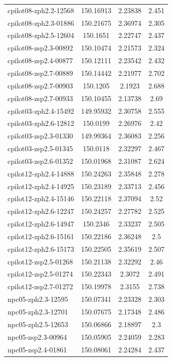 \documentclass[twocolumn,tight,times]{aastex63}
\begin{document}
\begin{center}
\begin{longtable}{l|c|c|c}
cpilot08-zph2.2-12568 & 150.16913 & 2.23838 & 2.451 \\
cpilot08-zph2.3-01886 & 150.21675 & 2.36974 & 2.305 \\
cpilot08-zph2.5-12604 & 150.1651 & 2.22747 & 2.437 \\
cpilot08-zsp2.3-00892 & 150.10474 & 2.21573 & 2.324 \\
cpilot08-zsp2.4-00877 & 150.12111 & 2.23542 & 2.432 \\
cpilot08-zsp2.7-00889 & 150.14442 & 2.21977 & 2.702 \\
cpilot08-zsp2.7-00903 & 150.1205 & 2.1923 & 2.688 \\
cpilot08-zsp2.7-00933 & 150.10455 & 2.13738 & 2.69 \\
cpilot03-zph2.4-15492 & 149.95932 & 2.30758 & 2.555 \\
cpilot03-zph2.6-12812 & 150.0199 & 2.26976 & 2.42 \\
cpilot03-zsp2.3-01330 & 149.99364 & 2.36083 & 2.256 \\
cpilot03-zsp2.5-01345 & 150.0118 & 2.32297 & 2.467 \\
cpilot03-zsp2.6-01352 & 150.01968 & 2.31087 & 2.624 \\
cpilot12-zph2.4-14888 & 150.24263 & 2.35848 & 2.278 \\
cpilot12-zph2.4-14925 & 150.23189 & 2.33713 & 2.456 \\
cpilot12-zph2.4-15146 & 150.22118 & 2.37094 & 2.52 \\
cpilot12-zph2.6-12247 & 150.24257 & 2.27782 & 2.525 \\
cpilot12-zph2.6-14947 & 150.2346 & 2.33237 & 2.505 \\
cpilot12-zph2.6-15161 & 150.22186 & 2.36248 & 2.5 \\
cpilot12-zph2.6-15173 & 150.22505 & 2.35619 & 2.507 \\
cpilot12-zsp2.5-01268 & 150.21138 & 2.32292 & 2.46 \\
cpilot12-zsp2.5-01274 & 150.22343 & 2.3072 & 2.491 \\
cpilot12-zsp2.7-01272 & 150.19978 & 2.3155 & 2.738 \\
npc05-zph2.3-12595 & 150.07341 & 2.23328 & 2.303 \\
npc05-zph2.3-12701 & 150.07675 & 2.17348 & 2.486 \\
npc05-zph2.5-12653 & 150.06866 & 2.18897 & 2.3 \\
npc05-zsp2.3-00964 & 150.05905 & 2.24059 & 2.283 \\
npc05-zsp2.4-01861 & 150.08061 & 2.24284 & 2.437 \\

\end{longtable}
\end{center}
\end{document}
